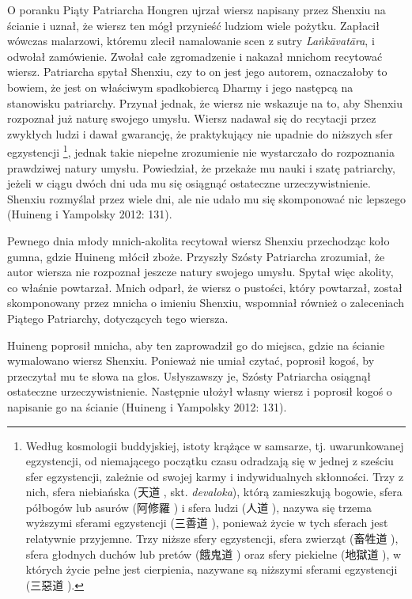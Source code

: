 O poranku Piąty Patriarcha Hongren ujrzał wiersz napisany przez Shenxiu na ścianie i uznał, że wiersz ten mógł przynieść ludziom wiele pożytku. Zapłacił wówczas malarzowi, któremu zlecił namalowanie scen z sutry \textit{La\.nkāvatāra}, i odwołał zamówienie.
Zwołał całe zgromadzenie i nakazał mnichom recytować wiersz. Patriarcha spytał Shenxiu, czy to on jest jego autorem, oznaczałoby to bowiem, że jest on właściwym spadkobiercą Dharmy i jego następcą na stanowisku patriarchy.
Przynał jednak, że wiersz nie wskazuje na to, aby Shenxiu rozpoznał już naturę swojego umysłu. Wiersz nadawał się do recytacji przez zwykłych ludzi i dawał gwarancję, że praktykujący nie upadnie do niższych sfer egzystencji%
\footnote{Według kosmologii buddyjskiej, istoty krążące w samsarze, tj. uwarunkowanej egzystencji, od niemającego początku czasu odradzają się w jednej z sześciu sfer egzystencji, zależnie od swojej karmy i indywidualnych skłonności. Trzy z nich, sfera niebiańska (天道 , skt. \textit{devaloka}), którą zamieszkują bogowie, sfera półbogów lub asurów (阿修羅 ) i sfera ludzi (人道 ), nazywa się trzema wyższymi sferami egzystencji (三善道 ), ponieważ życie w tych sferach jest relatywnie przyjemne. Trzy niższe sfery egzystencji, sfera zwierząt (畜牲道 ), sfera głodnych duchów lub pretów (餓鬼道 ) oraz sfery piekielne (地獄道 ), w których życie pełne jest cierpienia, nazywane są niższymi sferami egzystencji (三惡道 ).},
jednak takie niepełne zrozumienie nie wystarczało do rozpoznania prawdziwej natury umysłu.
Powiedział, że przekaże mu nauki i szatę patriarchy, jeżeli w ciągu dwóch dni uda mu się osiągnąć ostateczne urzeczywistnienie.
Shenxiu rozmyślał przez wiele dni, ale nie udało mu się skomponować nic lepszego
(Huineng i Yampolsky 2012: 131).

Pewnego dnia młody mnich-akolita recytował wiersz Shenxiu przechodząc koło gumna, gdzie Huineng młócił zboże. Przyszły Szósty Patriarcha zrozumiał, że autor wiersza nie rozpoznał jeszcze natury swojego umysłu. Spytał więc akolity, co właśnie powtarzał. Mnich odparł, że wiersz o pustości, który powtarzał, został skomponowany przez mnicha o imieniu Shenxiu, wspomniał również o zaleceniach Piątego Patriarchy, dotyczących tego wiersza.

Huineng poprosił mnicha, aby ten zaprowadził go do miejsca, gdzie na ścianie wymalowano wiersz Shenxiu. Ponieważ nie umiał czytać, poprosił kogoś, by przeczytał mu te słowa na głos. Usłyszawszy je, Szósty Patriarcha osiągnął ostateczne urzeczywistnienie. Następnie ułożył własny wiersz i poprosił kogoś o napisanie go na ścianie (Huineng i Yampolsky 2012: 131).
\vspace*{1em}

